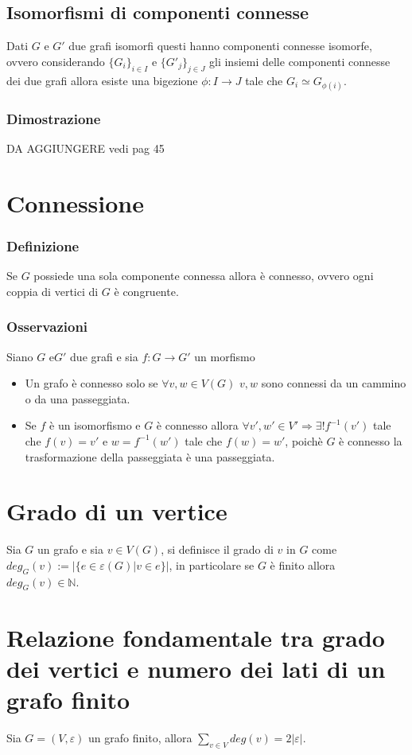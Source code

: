 \subsection{Isomorfismi di componenti connesse}
Dati $G$ e $G'$ due grafi isomorfi questi hanno componenti connesse isomorfe, ovvero considerando $\{G_i\}_{i\in I}$ e $\{G'_j\}_{j\in J}$ gli insiemi delle componenti connesse
dei due grafi allora esiste una bigezione $\phi:I\rightarrow J$ tale che $G_i\simeq G_{\phi(i)}$.
\subsubsection{Dimostrazione}
DA AGGIUNGERE vedi pag 45
\section{Connessione}
\subsubsection{Definizione}
Se $G$ possiede una sola componente connessa allora \`e connesso, ovvero ogni coppia di vertici di $G$ \`e congruente.
\subsubsection{Osservazioni}
Siano $G$ e$G'$ due grafi e sia $f:G\rightarrow G'$ un morfismo
\begin{itemize}
\item Un grafo \`e connesso solo se $\forall v,w \in V(G)$ $v,w$ sono connessi da un cammino o da una passeggiata.
\item Se $f$ \`e un isomorfismo e $G$ \`e connesso allora $\forall v', w'\in V'\Rightarrow\exists! f^{-1}(v')$ tale che $f(v)=v'$ e $w=f^{-1}(w')$ tale che $f(w)=w'$, poich\`e
$G$ \`e connesso la trasformazione della passeggiata \`e una passeggiata.
\end{itemize}
\section{Grado di un vertice}
Sia $G$ un grafo e sia $v\in V(G)$, si definisce il grado di $v$ in $G$ come $deg_G(v):=|\{e\in\varepsilon(G)|v\in e\}|$, in particolare se $G$ \`e finito allora $deg_G(v)\in
\mathbb{N}$. 
\section{Relazione fondamentale tra grado dei vertici e numero dei lati di un grafo finito}
Sia $G=(V,\varepsilon)$ un grafo finito, allora $\sum\limits_{v\in V}deg(v)=2|\varepsilon|$.
